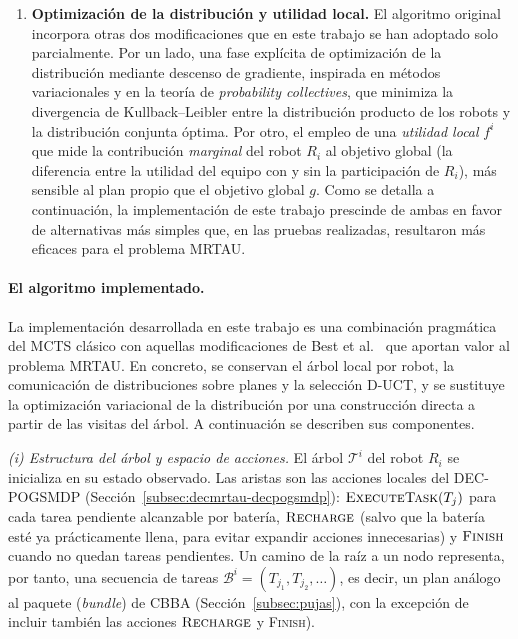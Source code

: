 \begin{enumerate}
    \item \textbf{Optimización de la distribución y utilidad local.} El algoritmo original incorpora otras dos modificaciones que en este trabajo se han adoptado solo parcialmente. Por un lado, una fase explícita de optimización de la distribución mediante descenso de gradiente, inspirada en métodos variacionales y en la teoría de \emph{probability collectives}, que minimiza la divergencia de Kullback--Leibler entre la distribución producto de los robots y la distribución conjunta óptima. Por otro, el empleo de una \emph{utilidad local} $f^{i}$ que mide la contribución \emph{marginal} del robot $R_i$ al objetivo global (la diferencia entre la utilidad del equipo con y sin la participación de $R_i$), más sensible al plan propio que el objetivo global $g$. Como se detalla a continuación, la implementación de este trabajo prescinde de ambas en favor de alternativas más simples que, en las pruebas realizadas, resultaron más eficaces para el problema MRTAU.
\end{enumerate}

\paragraph{El algoritmo implementado.}
La implementación desarrollada en este trabajo es una combinación pragmática del MCTS clásico con aquellas modificaciones de Best et al.~\cite{best2019decmcts} que aportan valor al problema MRTAU. En concreto, se conservan el árbol local por robot, la comunicación de distribuciones sobre planes y la selección D-UCT, y se sustituye la optimización variacional de la distribución por una construcción directa a partir de las visitas del árbol. A continuación se describen sus componentes.

\smallskip
\emph{(i) Estructura del árbol y espacio de acciones.}
El árbol $\mathcal{T}^{i}$ del robot $R_i$ se inicializa en su estado observado. Las aristas son las acciones locales del DEC-POGSMDP (Sección~\ref{subsec:decmrtau-decpogsmdp}): $\textsc{ExecuteTask}(T_j)$ para cada tarea pendiente alcanzable por batería, $\textsc{Recharge}$ (salvo que la batería esté ya prácticamente llena, para evitar expandir acciones innecesarias) y $\textsc{Finish}$ cuando no quedan tareas pendientes. Un camino de la raíz a un nodo representa, por tanto, una secuencia de tareas $\mathcal{B}^{i}=(T_{j_1},T_{j_2},\dots)$, es decir, un plan análogo al paquete (\textit{bundle}) de CBBA (Sección~\ref{subsec:pujas}), con la excepción de incluir también las acciones $\textsc{Recharge}$ y \textsc{Finish}).

